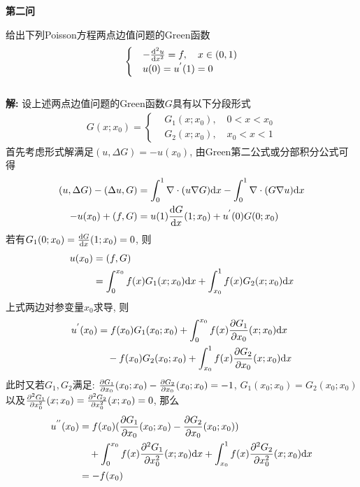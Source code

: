 \documentclass[12pt]{article}
\begin{document}
\begin{center}
	\textbf{第二问}
\end{center}
\noindent 给出下列Poisson方程两点边值问题的Green函数
\begin{align*}
	\begin{cases}
		&-\frac{{\rm d^2}u}{{\rm d}x^2} = f, \quad x \in(0,1)\\
		&u(0)=u^{'}(1)=0
	\end{cases}
\end{align*}
\quad \\
\noindent \textbf{解: }设上述两点边值问题的Green函数$G$具有以下分段形式
\begin{align*}
	G(x;x_0)=\begin{cases}
		&G_1(x;x_0),\quad 0<x<x_0\\
		&G_2(x;x_0),\quad x_0<x<1
	\end{cases}
\end{align*}
\noindent 首先考虑形式解满足$(u,\Delta{G})=-u(x_0)$, 由Green第二公式或分部积分公式可得
\begin{align*}
	(u,\Delta{G})-(\Delta{u},G)&=\int_{0}^{1}\nabla \cdot(u\nabla G){\rm d}x -\int_{0}^{1}\nabla \cdot(G\nabla u){\rm d}x\\
	-u(x_0)+(f,G)&=u(1)\frac{{\rm d}G}{{\rm d}x}(1;x_0)+u^{'}(0)G(0;x_0)
\end{align*}
\noindent 若有$G_1(0;x_0)=\frac{{\rm d}G}{{\rm d}x}(1;x_0)=0$, 则
\begin{align*}
	u(x_0)&=(f,G)\\
	&=\int_{0}^{x_0}f(x)G_1(x;x_0){\rm d}x +\int_{x_0}^{1}f(x)G_2(x;x_0){\rm d}x
\end{align*}
\noindent 上式两边对参变量$x_0$求导, 则
\begin{align*}
	u^{'}(x_0)&=f(x_0)G_1(x_0;x_0)+\int_{0}^{x_0}f(x)\frac{{\rm \partial}G_1}{{\rm \partial}x_0}(x;x_0){\rm d}x\\
	&\quad -f(x_0)G_2(x_0;x_0)+\int_{x_0}^{1}f(x)\frac{{\rm \partial}G_2}{{\rm \partial}x_0}(x;x_0){\rm d}x
\end{align*}
\noindent 此时又若$G_1,G_2$满足: $\frac{{\rm \partial}G_1}{{\rm \partial}x_0}(x_0;x_0)-\frac{{\rm \partial}G_2}{{\rm \partial}x_0}(x_0;x_0)=-1$, $G_1(x_0;x_0)=G_2(x_0;x_0)$以及$\frac{{\rm \partial}^2G_1}{{\rm \partial}x_0^2}(x;x_0)=\frac{{\rm \partial}^2G_2}{{\rm \partial}x_0^2}(x;x_0)=0$, 那么
\begin{align*}
	u^{''}(x_0)&=f(x_0)(\frac{{\rm \partial}G_1}{{\rm \partial}x_0}(x_0;x_0)-\frac{{\rm \partial}G_2}{{\rm \partial}x_0}(x_0;x_0))\\
	&\quad +\int_{0}^{x_0}f(x)\frac{{\rm \partial}^2G_1}{{\rm \partial}x_0^2}(x;x_0){\rm d}x+\int_{x_0}^{1}f(x)\frac{{\rm \partial}^2G_2}{{\rm \partial}x_0^2}(x;x_0){\rm d}x\\
	&=-f(x_0)
\end{align*}
\end{document}
